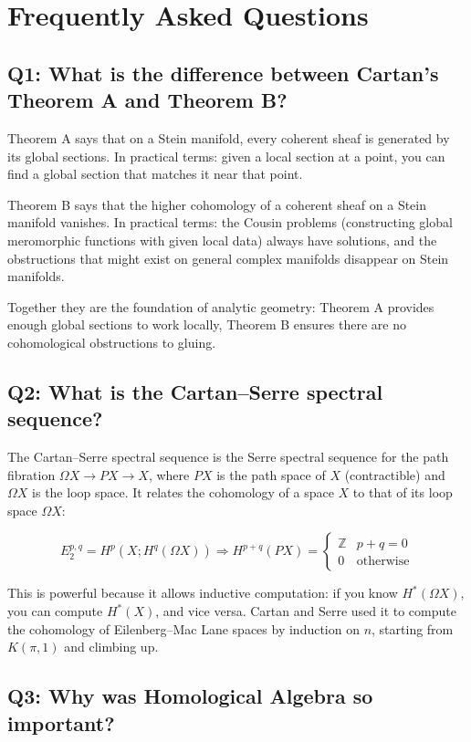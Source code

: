 \section{Frequently Asked Questions}

\subsection*{Q1: What is the difference between Cartan's Theorem A and Theorem B?}

Theorem A says that on a Stein manifold, every coherent sheaf is generated by its global sections. In practical terms: given a local section at a point, you can find a global section that matches it near that point.

Theorem B says that the higher cohomology of a coherent sheaf on a Stein manifold vanishes. In practical terms: the Cousin problems (constructing global meromorphic functions with given local data) always have solutions, and the obstructions that might exist on general complex manifolds disappear on Stein manifolds.

Together they are the foundation of analytic geometry: Theorem A provides enough global sections to work locally, Theorem B ensures there are no cohomological obstructions to gluing.

\subsection*{Q2: What is the Cartan--Serre spectral sequence?}

The Cartan--Serre spectral sequence is the Serre spectral sequence for the path fibration $\Omega X \to PX \to X$, where $PX$ is the path space of $X$ (contractible) and $\Omega X$ is the loop space. It relates the cohomology of a space $X$ to that of its loop space $\Omega X$:

\[
E_2^{p,q} = H^p(X; H^q(\Omega X)) \Longrightarrow H^{p+q}(PX) = \begin{cases} \mathbb{Z} & p+q=0 \\ 0 & \text{otherwise} \end{cases}
\]

This is powerful because it allows inductive computation: if you know $H^*(\Omega X)$, you can compute $H^*(X)$, and vice versa. Cartan and Serre used it to compute the cohomology of Eilenberg--Mac Lane spaces by induction on $n$, starting from $K(\pi, 1)$ and climbing up.

\subsection*{Q3: Why was Homological Algebra so important?}

